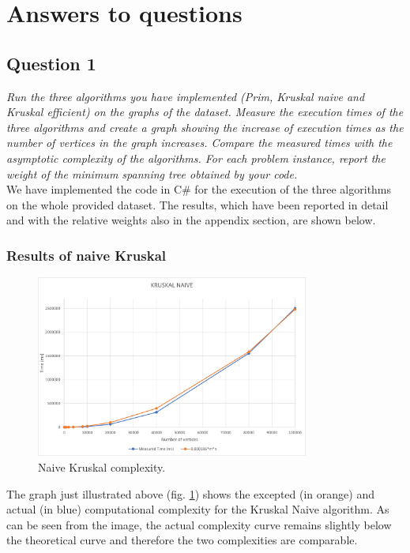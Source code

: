 \section{Answers to questions}

\subsection{Question 1}
\textit{Run the three algorithms you have implemented (Prim, Kruskal naive and Kruskal efficient) on the graphs of the dataset. Measure the execution times of the three algorithms and create a graph showing the increase of execution times as the number of vertices in the graph increases. Compare the measured times with the asymptotic complexity of the algorithms. For each problem instance, report the weight of the minimum spanning tree obtained by your code.}\\
\noindent
We have implemented the code in C\# for the execution of the three algorithms on the whole provided dataset. The results, which have been reported in detail and with the relative weights also in the appendix section, are shown below.

\subsubsection{Results of naive Kruskal}
\begin{figure}[H]
	\centering
	\includegraphics[width=0.8\textwidth]{../img/KruskalNaive.png}
    \caption{Naive Kruskal complexity.}
	\label{fig:kruskal}
\end{figure}
The graph just illustrated above (fig. \ref{fig:kruskal}) shows the excepted (in orange) and actual (in blue) computational complexity for the Kruskal Naive algorithm. As can be seen from the image, the actual complexity curve remains slightly below the theoretical curve and therefore the two complexities are comparable.

